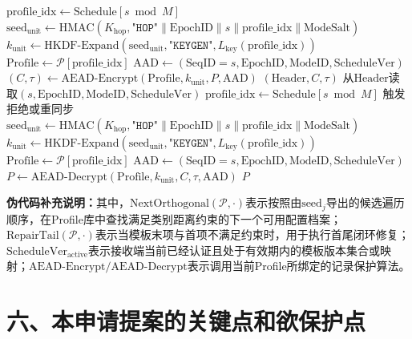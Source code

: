 ﻿\documentclass[12pt,a4paper]{article}
\begin{document}
\begin{algorithm}[H]
\caption{基于$\text{SeqID}$的逐单元保护与无状态恢复}
\begin{algorithmic}[1]
    \State $\text{profile\_idx} \gets \text{Schedule}[s \bmod M]$
    \State $\text{seed}_{\text{unit}} \gets \text{HMAC}(K_{\text{hop}}, \texttt{"HOP"} \| \text{EpochID} \| s \| \text{profile\_idx} \| \text{ModeSalt})$
    \State $k_{\text{unit}} \gets \text{HKDF-Expand}(\text{seed}_{\text{unit}}, \texttt{"KEYGEN"}, L_{\text{key}}(\text{profile\_idx}))$
    \State $\text{Profile} \gets \mathcal{P}[\text{profile\_idx}]$
    \State $\text{AAD} \gets (\text{SeqID}=s, \text{EpochID}, \text{ModeID}, \text{ScheduleVer})$
    \State $(C, \tau) \gets \text{AEAD-Encrypt}(\text{Profile}, k_{\text{unit}}, P, \text{AAD})$
    \State \Return $(\text{Header}, C, \tau)$
\EndProcedure
\Statex
{}
    \State 从$\text{Header}$读取$(s, \text{EpochID}, \text{ModeID}, \text{ScheduleVer})$
    \State $\text{profile\_idx} \gets \text{Schedule}[s \bmod M]$
        \State 触发拒绝或重同步
    \EndIf
    \State $\text{seed}_{\text{unit}} \gets \text{HMAC}(K_{\text{hop}}, \texttt{"HOP"} \| \text{EpochID} \| s \| \text{profile\_idx} \| \text{ModeSalt})$
    \State $k_{\text{unit}} \gets \text{HKDF-Expand}(\text{seed}_{\text{unit}}, \texttt{"KEYGEN"}, L_{\text{key}}(\text{profile\_idx}))$
    \State $\text{Profile} \gets \mathcal{P}[\text{profile\_idx}]$
    \State $\text{AAD} \gets (\text{SeqID}=s, \text{EpochID}, \text{ModeID}, \text{ScheduleVer})$
    \State $P \gets \text{AEAD-Decrypt}(\text{Profile}, k_{\text{unit}}, C, \tau, \text{AAD})$
    \State \Return $P$
\EndProcedure
\end{algorithmic}
\end{algorithm}

\noindent\textbf{伪代码补充说明：}其中，$\text{NextOrthogonal}(\mathcal{P}, \cdot)$表示按照由$\text{seed}_j$导出的候选遍历顺序，在Profile库中查找满足类别距离约束的下一个可用配置档案；$\text{RepairTail}(\mathcal{P}, \cdot)$表示当模板末项与首项不满足约束时，用于执行首尾闭环修复；$\text{ScheduleVer}_{\text{active}}$表示接收端当前已经认证且处于有效期内的模板版本集合或映射；$\text{AEAD-Encrypt}/\text{AEAD-Decrypt}$表示调用当前Profile所绑定的记录保护算法。


\section*{六、本申请提案的关键点和欲保护点}
\end{document}
